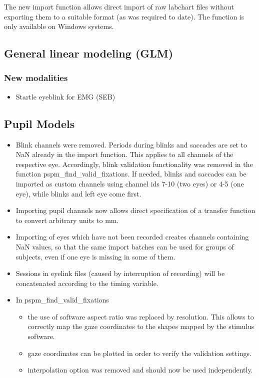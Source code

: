 \documentclass[english]{article}
\numberwithin{equation}{section}
\numberwithin{figure}{section}
\begin{document}
The new import function allows direct import of raw labchart files
without exporting them to a suitable format (as was required to date).
The function is only available on Windows systems.

\subsection*{General linear modeling (GLM)}

\subsubsection*{New modalities}
\begin{itemize}
\item Startle eyeblink for EMG (SEB)
\end{itemize}

\subsection*{Pupil Models}
\begin{itemize}
\item Blink channels were removed. Periods during blinks and saccades are
set to NaN already in the import function. This applies to all channels
of the respective eye. Accordingly, blink validation functionality
was removed in the function pspm\_find\_valid\_fixations. If needed,
blinks and saccades can be imported as custom channels using channel
ids 7-10 (two eyes) or 4-5 (one eye), while blinks and left eye come
first.
\item Importing pupil channels now allows direct specification of a transfer
function to convert arbitrary units to mm. 
\item Importing of eyes which have not been recorded creates channels containing
NaN values, so that the same import batches can be used for groups
of subjects, even if one eye is missing in some of them.
\item Sessions in eyelink files (caused by interruption of recording) will
be concatenated according to the timing variable.
\item In pspm\_find\_valid\_fixations 
\begin{itemize}
\item the use of software aspect ratio was replaced by resolution. This
allows to correctly map the gaze coordinates to the shapes mapped
by the stimulus software.
\item gaze coordinates can be plotted in order to verify the validation
settings.
\item interpolation option was removed and should now be used independently.
\end{itemize}
\end{itemize}
\end{document}
